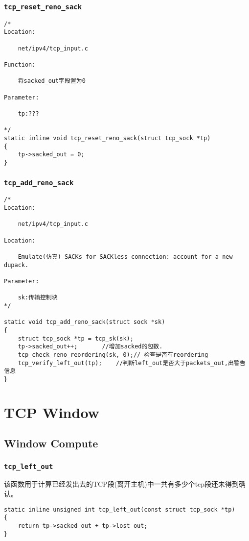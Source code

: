         \subsubsection{\texttt{tcp_reset_reno_sack}}
\begin{verbatim}
/*
Location:

    net/ipv4/tcp_input.c

Function:

    将sacked_out字段置为0

Parameter:

    tp:???

*/
static inline void tcp_reset_reno_sack(struct tcp_sock *tp)
{
    tp->sacked_out = 0;
}
\end{verbatim}    

        \subsubsection{\texttt{tcp_add_reno_sack}}
\begin{verbatim}
/* 
Location:

    net/ipv4/tcp_input.c

Location:

    Emulate(仿真) SACKs for SACKless connection: account for a new dupack.

Parameter:

    sk:传输控制块
*/

static void tcp_add_reno_sack(struct sock *sk)
{
    struct tcp_sock *tp = tcp_sk(sk);
    tp->sacked_out++;       //增加sacked的包数.
    tcp_check_reno_reordering(sk, 0);// 检查是否有reordering
    tcp_verify_left_out(tp);    //判断left_out是否大于packets_out,出警告信息
}
\end{verbatim}
\section{TCP Window}
    \subsection{Window Compute}
        \subsubsection{\texttt{tcp_left_out}}
            该函数用于计算已经发出去的TCP段(离开主机)中一共有多少个tcp段还未得到确认。
\begin{verbatim}
static inline unsigned int tcp_left_out(const struct tcp_sock *tp)
{
    return tp->sacked_out + tp->lost_out;
}
\end{verbatim}
